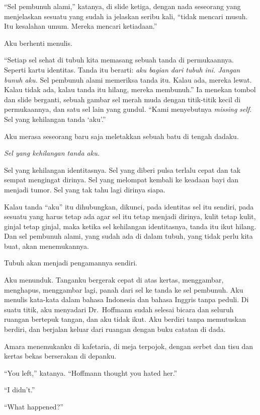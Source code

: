 \documentclass[11pt,twoside,openany]{book}
\makeatletter
\newcommand{\scenebreak}{\par\vspace{0.9em}{\centering\textsc{*\hspace{0.7em}*\hspace{0.7em}*}\par}\vspace{0.9em}\@afterindentfalse\@afterheading}
\makeatother
\begin{document}
``Sel pembunuh alami,'' katanya, di slide ketiga, dengan nada seseorang yang menjelaskan sesuatu yang sudah ia jelaskan seribu kali, ``tidak mencari musuh. Itu kesalahan umum. Mereka mencari ketiadaan.''

Aku berhenti menulis.

``Setiap sel sehat di tubuh kita memasang sebuah tanda di permukaannya. Seperti kartu identitas. Tanda itu berarti: \emph{aku bagian dari tubuh ini. Jangan bunuh aku.} Sel pembunuh alami memeriksa tanda itu. Kalau ada, mereka lewat. Kalau tidak ada, kalau tanda itu hilang, mereka membunuh.'' Ia menekan tombol dan slide berganti, sebuah gambar sel merah muda dengan titik-titik kecil di permukaannya, dan satu sel lain yang gundul. ``Kami menyebutnya \emph{missing self}. Sel yang kehilangan tanda `aku'.''

Aku merasa seseorang baru saja meletakkan sebuah batu di tengah dadaku.

\emph{Sel yang kehilangan tanda aku.}

Sel yang kehilangan identitasnya. Sel yang diberi pulsa terlalu cepat dan tak sempat mengingat dirinya. Sel yang melompat kembali ke keadaan bayi dan menjadi tumor. Sel yang tak tahu lagi dirinya siapa.

Kalau tanda ``aku'' itu dihubungkan, dikunci, pada identitas sel itu sendiri, pada sesuatu yang harus tetap ada agar sel itu tetap menjadi dirinya, kulit tetap kulit, ginjal tetap ginjal, maka ketika sel kehilangan identitasnya, tanda itu ikut hilang. Dan sel pembunuh alami, yang sudah ada di dalam tubuh, yang tidak perlu kita buat, akan menemukannya.

Tubuh akan menjadi pengamannya sendiri.

Aku menunduk. Tanganku bergerak cepat di atas kertas, menggambar, menghapus, menggambar lagi, panah dari sel ke tanda ke sel pembunuh. Aku menulis kata-kata dalam bahasa Indonesia dan bahasa Inggris tanpa peduli. Di suatu titik, aku menyadari Dr.~Hoffmann sudah selesai bicara dan seluruh ruangan bertepuk tangan, dan aku tidak ikut. Aku berdiri tanpa memutuskan berdiri, dan berjalan keluar dari ruangan dengan buku catatan di dada.

\scenebreak
Amara menemukanku di kafetaria, di meja terpojok, dengan serbet dan tisu dan kertas bekas berserakan di depanku.

``You left,'' katanya. ``Hoffmann thought you hated her.''

``I didn't.''

``What happened?''
\end{document}
